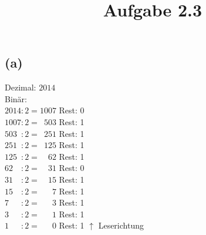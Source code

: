 \documentclass[a4paper,12pt]{article}
\title{Aufgabe 2.3}
\begin{document}
	\maketitle
	\subsection*{(a)}
	Dezimal: $2014$ \\
	Bin\"ar: \\
	$2014 : 2 = 1007$							Rest: 0 \\
	$1007 : 2 =\hspace{6pt}  503$				Rest: 1 \\
	$503\hspace{6pt} : 2 =\hspace{6pt}  251$	Rest: 1 \\
	$ 251\hspace{6pt} : 2 =\hspace{6pt}  125$	Rest: 1 \\
	$ 125\hspace{6pt} : 2 = \hspace{12pt}  62$	Rest: 1 \\
	$  62\hspace{12pt} : 2 = \hspace{12pt}  31$	Rest: 0 \\
	$  31\hspace{12pt} : 2 =\hspace{12pt}   15$	Rest: 1 \\
	$  15\hspace{12pt} : 2 = \hspace{18pt}   7$	Rest: 1 \\
	$   7\hspace{18pt} : 2 = \hspace{18pt}   3$	Rest: 1 \\
	$   3\hspace{18pt} : 2 =  \hspace{18pt}  1$	Rest: 1 \\
	$   1\hspace{18pt} : 2 =\hspace{18pt}    0$	Rest: 1 $\uparrow$ Leserichtung
\end{document}
